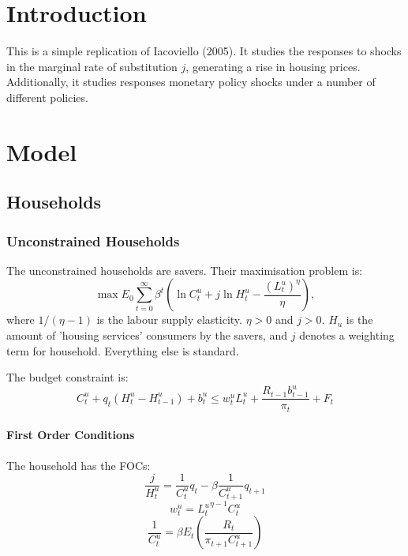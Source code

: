 \documentclass[11pt, a4paper]{article}
\begin{document}
\section{Introduction}

This is a simple replication of Iacoviello (2005). It studies the responses to shocks in the marginal rate of substitution $j$, generating a rise in housing prices. Additionally, it studies responses monetary policy shocks under a number of different policies.

	\section{Model}
	
	\subsection{Households}
	
	\subsubsection{Unconstrained Households}
	
	The unconstrained households are savers. Their maximisation problem is:
	\begin{equation}
\max E_{0} \sum_{t=0}^{\infty} \beta^{t}\left(\ln C_{t}^{u}+j \ln H_{t}^{u}-\frac{\left(L_{t}^{u}\right)^{\eta}}{\eta}\right),
\end{equation}
where $1 / (\eta -1)$ is the labour supply elasticity. $\eta > 0$ and $j >0$. $H_u$ is the amount of 'housing services' consumers by the savers, and $j$ denotes a weighting term for household. Everything else is standard.

The budget constraint is:
\begin{equation}
C_{t}^{u}+q_{t}\left(H_{t}^{u}-H_{t-1}^{u}\right)+b_{t}^{u} \leq w_{t}^{u} L_{t}^{u}+\frac{R_{t-1} b_{t-1}^{u}}{\pi_{t}}+F_{t}
\end{equation}

\paragraph{First Order Conditions} The household has the FOCs:
\begin{equation}
  \frac{j}{H^{u}_t} = \frac{1}{C^{u}_{t}} q_t - \beta \frac{1}{C^{u}_{t+1}} q_{t+1}
\end{equation}
\begin{equation}
  w_t^u = {L_t^{u}}^{\eta -1} C^u_t
\end{equation}
\begin{equation}
\frac{1}{C_{t}^{u}}=\beta E_{t}\left(\frac{R_{t}}{\pi_{t+1} C_{t+1}^{u}}\right)
\end{equation}
\end{document}
